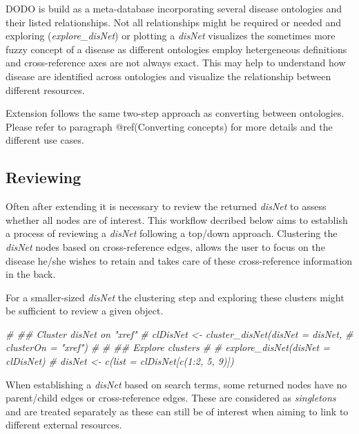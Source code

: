 \documentclass[9pt,a4paper,]{extarticle}
\newenvironment{Shaded}{\begin{snugshade}}{\end{snugshade}}
\newcommand{\CommentTok}[1]{\textcolor[rgb]{0.56,0.35,0.01}{\textit{#1}}}
\begin{document}
DODO is build as a meta-database incorporating several disease ontologies and their listed relationships. Not all relationships might be required or needed and exploring (\emph{explore\_disNet}) or plotting a \emph{disNet} visualizes the sometimes more fuzzy concept of a disease as different ontologies employ hetergeneous definitions and cross-reference axes are not always exact. This may help to understand how disease are identified across ontologies and visualize the relationship between different resources.

Extension follows the same two-step approach as converting between ontologies. Please refer to paragraph @ref(Converting concepts) for more details and the different use cases.

\hypertarget{reviewing}{%
\subsection{Reviewing}\label{reviewing}}

Often after extending it is necessary to review the returned \emph{disNet} to assess whether all nodes are of interest. This workflow decribed below aims to establish a process of reviewing a \emph{disNet} following a top/down approach. Clustering the \emph{disNet} nodes based on cross-reference edges, allows the user to focus on the disease he/she wishes to retain and takes care of these cross-reference information in the back.

For a smaller-sized \emph{disNet} the clustering step and exploring these clusters might be sufficient to review a given object.

\begin{Shaded}
\begin{Highlighting}[]
\CommentTok{# ## Cluster disNet on "xref"}
\CommentTok{# clDisNet <- cluster_disNet(disNet = disNet, }
\CommentTok{#                           clusterOn = "xref")}
\CommentTok{# }
\CommentTok{# ## Explore clusters}
\CommentTok{# # explore_disNet(disNet = clDisNet)}
\CommentTok{# disNet <- c(list = clDisNet[c(1:2, 5, 9)])}
\end{Highlighting}
\end{Shaded}

When establishing a \emph{disNet} based on search terms, some returned nodes have no parent/child edges or cross-reference edges. These are considered as \emph{singletons} and are treated separately as these can still be of interest when aiming to link to different external resources.
\end{document}
